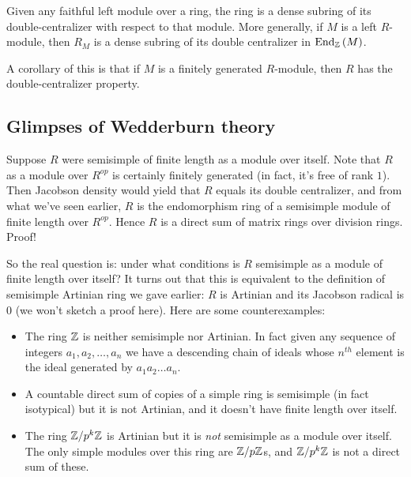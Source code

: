 \documentclass[a4paper]{amsart}
\newcommand{\Endo}[2]{\text{End}_{#1}\left(#2\right)}
\begin{document}
\begin{theorem}
  Given any faithful left module over a ring, the ring is a dense
  subring of its double-centralizer with respect to that module. More
  generally, if $M$ is a left $R$-module, then $R_M$ is a dense
  subring of its double centralizer in $\Endo{\Z}{M}$.
\end{theorem}

A corollary of this is that if $M$ is a finitely generated $R$-module,
then $R$ has the double-centralizer property. 

\subsection{Glimpses of Wedderburn theory}

Suppose $R$ were semisimple of finite length as a module over itself.
Note that $R$ as a module over $R^{op}$ is certainly finitely
generated (in fact, it's free of rank $1$). Then Jacobson density would
yield that $R$ equals its double centralizer, and from what we've seen
earlier, $R$ is the endomorphism ring of a semisimple module of finite
length over $R^{op}$. Hence $R$ is a direct sum of matrix rings over
division rings. Proof!

So the real question is: under what conditions is $R$ semisimple as a
module of finite length over itself? It turns out that this is
equivalent to the definition of semisimple Artinian ring we gave
earlier: $R$ is Artinian and its Jacobson radical is $0$ (we won't
sketch a proof here). Here are some counterexamples:

\begin{itemize}

\item The ring $\mathbb{Z}$ is neither semisimple nor Artinian. In fact given
  any sequence of integers $a_1, a_2, \ldots, a_n$ we have a
  descending chain of ideals whose $n^{th}$ element is the ideal
  generated by $a_1a_2\ldots a_n$.

\item A countable direct sum of copies of a simple ring is semisimple
  (in fact isotypical) but it is not Artinian, and it doesn't have
  finite length over itself.

\item The ring $\mathbb{Z}/p^k\mathbb{Z}$ is Artinian but it is {\em not} semisimple
  as a module over itself. The only simple modules over this ring are
  $\mathbb{Z}/p\mathbb{Z}$s, and $\mathbb{Z}/p^k\mathbb{Z}$ is not a direct sum of these.

\end{itemize}
\end{document}
